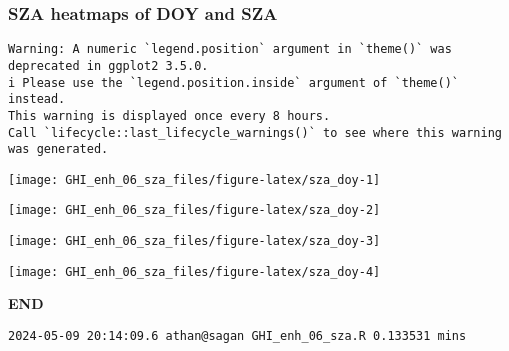 \documentclass[
  10pt,
  a4paper,oneside]{article}
\begin{document}
\newpage
\FloatBarrier

\hypertarget{sza-heatmaps-of-doy-and-sza}{%
\subsubsection{SZA heatmaps of DOY and SZA}\label{sza-heatmaps-of-doy-and-sza}}

\begin{verbatim}
Warning: A numeric `legend.position` argument in `theme()` was deprecated in ggplot2 3.5.0.
i Please use the `legend.position.inside` argument of `theme()` instead.
This warning is displayed once every 8 hours.
Call `lifecycle::last_lifecycle_warnings()` to see where this warning was generated.
\end{verbatim}

\begin{center}\texttt{[image: GHI\_enh\_06\_sza\_files/figure-latex/sza\_doy-1]} \end{center}

\begin{center}\texttt{[image: GHI\_enh\_06\_sza\_files/figure-latex/sza\_doy-2]} \end{center}

\begin{center}\texttt{[image: GHI\_enh\_06\_sza\_files/figure-latex/sza\_doy-3]} \end{center}

\begin{center}\texttt{[image: GHI\_enh\_06\_sza\_files/figure-latex/sza\_doy-4]} \end{center}

\textbf{END}

\begin{verbatim}
2024-05-09 20:14:09.6 athan@sagan GHI_enh_06_sza.R 0.133531 mins
\end{verbatim}
\end{document}
